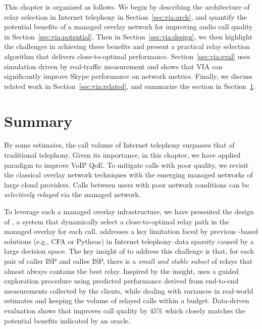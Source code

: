 This chapter is organized as follows.
We begin by describing the architecture of relay selection in Internet telephony in Section~\ref{sec:via:arch}, and quantify the potential benefits of a managed overlay
network for improving audio call quality in Section~\ref{sec:via:potential}.
Then in Section~\ref{sec:via:design}, we then highlight the challenges in achieving these benefits and present 
a practical relay selection algorithm
that delivers close-to-optimal performance.
Section~\ref{sec:via:eval} uses simulation driven by real-traffic measurement and shows 
that VIA can significantly improve
Skype performance on network metrics.
Finally, we discuss related work in Section~\ref{sec:via:related}, and 
summarize the section in Section~\ref{sec:via:summary}.













\section{Summary}
\label{sec:via:summary}

By some estimates, the call volume of Internet telephony surpasses that 
of traditional telephony. Given its importance, in this chapter, we 
have applied \ddn paradigm to improve VoIP QoE.
To mitigate calls with poor quality, we revisit the classical overlay network 
techniques with the emerging managed networks of large cloud providers. 
Calls between users with poor network conditions can be {\em selectively relayed}
via the managed network.

To leverage such a managed overlay infrastructure, we have presented the 
design of  \hybrid, a system that dynamically select a close-to-optimal relay
path in the managed overlay for each call.
\hybrid addresses a key limitation faced by previous \ddn-based solutions 
(e.g., CFA or Pytheas) in Internet telephony--data sparsity caused by a large
decision space.
The key insight of \hybrid to address this challenge is that, for each pair of caller 
ISP and callee ISP, there is a {\em small and stable subset} of relays that 
almost always contains the best relay.
Inspired by the insight, \hybrid uses a guided 
 exploration procedure using predicted performance 
 derived from end-to-end measurements collected by 
 the clients, while dealing with variances in real-world estimates and keeping 
 the volume of relayed calls within a budget. 
 Data-driven evaluation shows that \hybrid improves call quality by 
 $45\%$ which closely matches the potential benefits indicated by an oracle. 

